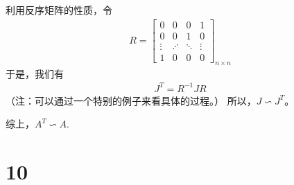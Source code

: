 \documentclass{article}
\begin{document}
\begin{itemize}
        利用反序矩阵的性质，令
        \begin{align*}
          R = \begin{bmatrix}
                0      & 0       & 0      & 1      \\
                0      & 0       & 1      & 0      \\
                \vdots & \iddots & \ddots & \vdots \\
                1      & 0       & 0      & 0
              \end{bmatrix}_{n \times n}
        \end{align*}
        于是，我们有
        \begin{align*}
          J^T = R^{-1} J R
        \end{align*}
        （注：可以通过一个特别的例子来看具体的过程。）
        所以，$J \backsim J^T$。

        综上，$A^T \backsim A$.
\end{itemize}

\section*{10}
\end{document}
